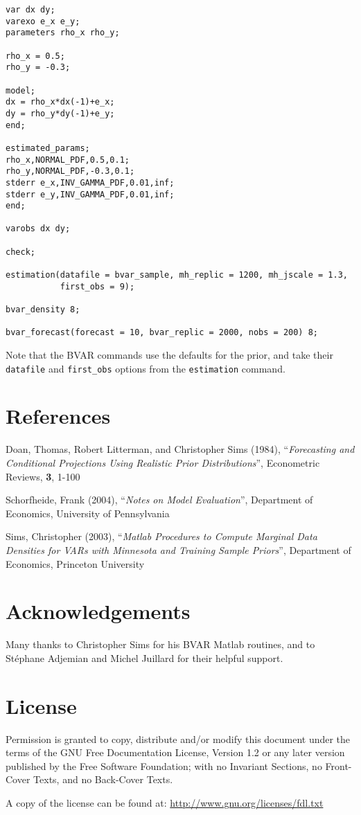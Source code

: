 \documentclass[10pt,a4paper]{article}
\begin{document}
\begin{verbatim}
var dx dy;
varexo e_x e_y;
parameters rho_x rho_y;

rho_x = 0.5;
rho_y = -0.3;

model;
dx = rho_x*dx(-1)+e_x;
dy = rho_y*dy(-1)+e_y;
end;

estimated_params;
rho_x,NORMAL_PDF,0.5,0.1;
rho_y,NORMAL_PDF,-0.3,0.1;
stderr e_x,INV_GAMMA_PDF,0.01,inf;
stderr e_y,INV_GAMMA_PDF,0.01,inf;
end;

varobs dx dy;

check;

estimation(datafile = bvar_sample, mh_replic = 1200, mh_jscale = 1.3,
           first_obs = 9);

bvar_density 8;

bvar_forecast(forecast = 10, bvar_replic = 2000, nobs = 200) 8;
\end{verbatim}

Note that the BVAR commands use the defaults for the prior, and take their \texttt{datafile} and \texttt{first\_obs} options from the \texttt{estimation} command.



\section*{References}

\noindent Doan, Thomas, Robert Litterman, and Christopher Sims (1984), ``\textit{Forecasting and Conditional Projections Using Realistic Prior Distributions}'', Econometric Reviews, \textbf{3}, 1-100

Schorfheide, Frank (2004), ``\textit{Notes on Model Evaluation}'', Department of Economics, University of Pennsylvania

Sims, Christopher (2003), ``\textit{Matlab Procedures to Compute Marginal Data Densities for VARs with Minnesota and Training Sample Priors}'', Department of Economics, Princeton University

\section*{Acknowledgements}

Many thanks to Christopher Sims for his BVAR Matlab routines, and to St\'ephane Adjemian and Michel Juillard for their helpful support.

\section*{License}

Permission is granted to copy, distribute and/or modify this document under the terms of the GNU Free Documentation License, Version 1.2 or any later version published by the Free Software Foundation; with no Invariant Sections, no Front-Cover Texts, and no Back-Cover Texts.

A copy of the license can be found at:
\url{http://www.gnu.org/licenses/fdl.txt}
\end{document}
